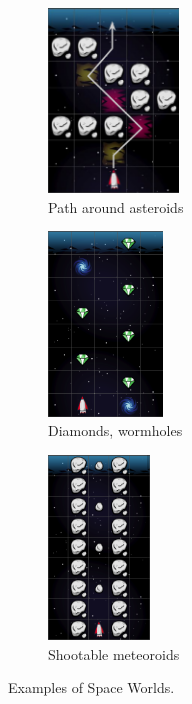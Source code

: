 \begin{figure}[htb]
\centering
\begin{subfigure}[t]{0.35\textwidth}
\centering
\includegraphics[height=49mm]{img/spaceworld-path}
\caption{Path around asteroids}
\label{fig:spaceworld-path}
\end{subfigure}%
\begin{subfigure}[t]{0.33\textwidth}
\centering
\includegraphics[height=49mm]{img/spaceworld-wormholes}
\caption{Diamonds, wormholes}
\label{fig:spaceworld-wormholes}
\end{subfigure}
\begin{subfigure}[t]{0.3\textwidth}
\centering
\includegraphics[height=49mm]{img/spaceworld-meteoroids}
\caption{Shootable meteoroids}
\label{fig:spaceworld-meteoroids}
\end{subfigure}
\caption{Examples of Space Worlds.}
\label{fig:spaceworld}
\end{figure}




